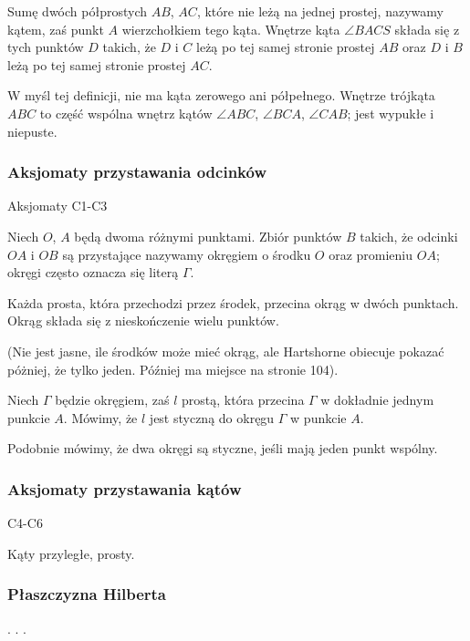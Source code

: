 \begin{definition}[kąt]
    Sumę dwóch półprostych $AB$, $AC$, które nie leżą na jednej prostej, nazywamy kątem, zaś punkt $A$ wierzchołkiem tego kąta.
    Wnętrze kąta $\angle BACS$ składa się z tych punktów $D$ takich, że $D$ i $C$ leżą po tej samej stronie prostej $AB$ oraz $D$ i $B$ leżą po tej samej stronie prostej $AC$.
\end{definition} %

W myśl tej definicji, nie ma kąta zerowego ani półpełnego.
Wnętrze trójkąta $ABC$ to część wspólna wnętrz kątów $\angle ABC$, $\angle BCA$, $\angle CAB$; jest wypukłe i niepuste.

\subsubsection{Aksjomaty przystawania odcinków}
Aksjomaty C1-C3

\begin{definition}[okrąg]
    Niech $O$, $A$ będą dwoma różnymi punktami.
    Zbiór punktów $B$ takich, że odcinki $OA$ i $OB$ są przystające nazywamy okręgiem o środku $O$ oraz promieniu $OA$; okręgi często oznacza się literą $\Gamma$.
\end{definition} %

\begin{proposition}
    Każda prosta, która przechodzi przez środek, przecina okrąg w dwóch punktach.
    Okrąg składa się z nieskończenie wielu punktów.
\end{proposition}

(Nie jest jasne, ile środków może mieć okrąg, ale Hartshorne \cite[s. 89]{hartshorne2000} obiecuje pokazać póżniej, że tylko jeden.
Później ma miejsce na stronie 104).

\begin{definition}[styczna]
    Niech $\Gamma$ będzie okręgiem, zaś $l$ prostą, która przecina $\Gamma$ w dokładnie jednym punkcie $A$.
    Mówimy, że $l$ jest styczną do okręgu $\Gamma$ w punkcie $A$.
\end{definition}

Podobnie mówimy, że dwa okręgi są styczne, jeśli mają jeden punkt wspólny.

\subsubsection{Aksjomaty przystawania kątów}
C4-C6

Kąty przyległe, prosty.

\subsubsection{Płaszczyzna Hilberta}

. . .

%